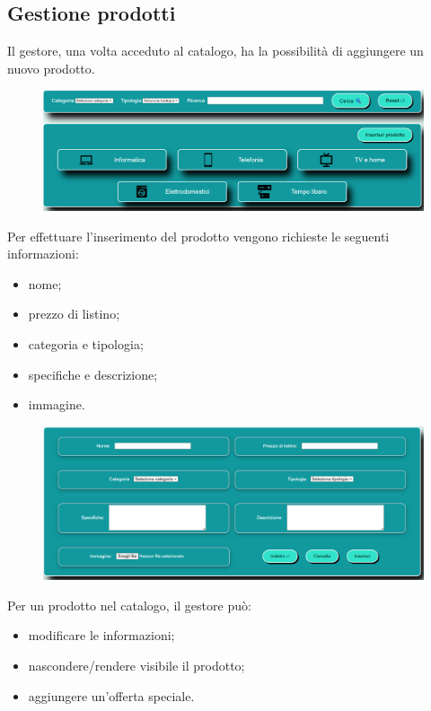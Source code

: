 \documentclass[a4paper, 14pt]{article}
\begin{document}
\begin{flushleft}
			\subsection{Gestione prodotti}
				Il gestore, una volta acceduto al catalogo, ha la possibilità di aggiungere un nuovo prodotto.
				\begin{figure}[H]
					\centering
					\includegraphics[width=\textwidth, frame=2pt]{"screenInserimentoCatalogo.png"}	
				\end{figure}
				Per effettuare l'inserimento del prodotto vengono richieste le seguenti informazioni:
					\begin{itemize}
						\item nome;
						\item prezzo di listino;
						\item categoria e tipologia;
						\item specifiche e descrizione;
						\item immagine.
					\end{itemize}
				\begin{figure}[H]
					\centering
					\includegraphics[width=\textwidth, frame=2pt]{"screenInserimentoProdotto.png"}	
				\end{figure}
				Per un prodotto nel catalogo, il gestore può:
					\begin{itemize}
						\item modificare le informazioni;
						\item nascondere/rendere visibile il prodotto;
						\item aggiungere un'offerta speciale.

\end{itemize}
\end{flushleft}
\end{document}
